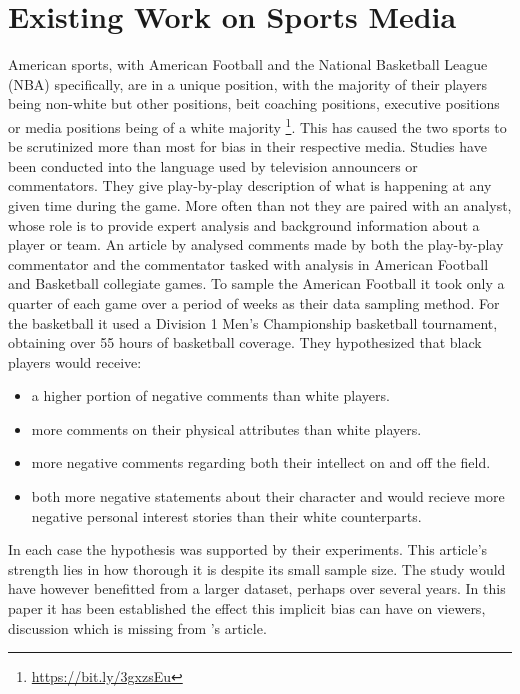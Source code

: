 \documentclass[oneside,12pt]{Classes/RoboticsLaTeX}
\begin{document}
\section{Existing Work on Sports Media}
American sports, with American Football and the National Basketball League (NBA) specifically, are in a unique position, with the majority
of their players being non-white but other positions, beit coaching positions, executive positions or media positions being of a white majority \footnote{\url{https://bit.ly/3gxzsEu}}.
This has caused the two sports to be scrutinized more than most for bias in their respective media.
Studies have been conducted into the language used by television announcers or commentators. They give play-by-play description of what is happening at any given
time during the game. More often than not they are paired with an analyst, whose role is to provide expert analysis and background information about a player or team. 
An article by \citep{ColorCoded} analysed comments made by both the play-by-play commentator and the commentator tasked with analysis in American Football and Basketball collegiate games.
To sample the American Football it took only a quarter of each game over a period of weeks as their data sampling method.
For the basketball it used a Division 1 Men's Championship basketball tournament, obtaining over 55 hours of basketball coverage. 
They hypothesized that black players would receive:
\begin{itemize}
  \item a higher portion of negative comments than white players.
  \item more comments on their physical attributes than white players.
  \item more negative comments regarding both their intellect on and off the field.
  \item both more negative statements about their character and would recieve more negative personal interest stories than their white counterparts.
\end{itemize}
In each case the hypothesis was supported by their experiments.
This article's strength lies in how thorough it is despite its small sample size. The study would have however benefitted from a larger dataset, perhaps over
several years. In this paper it has been established the effect this implicit bias can have on viewers, discussion which is missing from \citet{ColorCoded}'s article.
\end{document}
